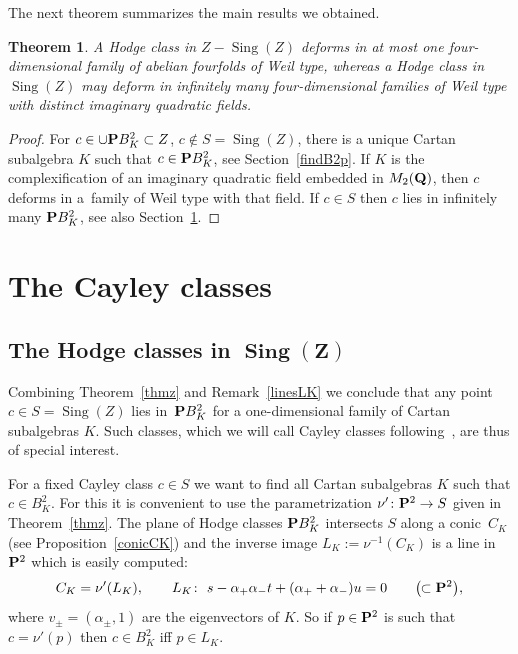 \documentclass[10pt,a4paper]{amsart}
\numberwithin{equation}{section}
\newtheorem{Theorem}{Theorem}[section]
\begin{document}
The next theorem summarizes the main results we obtained.

\begin{Theorem} \label{thmsum}
A Hodge class in $Z-\operatorname{Sing}(Z)$ deforms in at most one four-dimensional family
of abelian fourfolds of Weil type, whereas a Hodge class in~$\operatorname{Sing}(Z)$ may deform in infinitely many
four-dimensional families of Weil type with distinct imaginary quadratic fields.
\end{Theorem}

\begin{proof}
For $c\in \cup {\bf P} B^2_K\subset Z$, $c\not\in S=\operatorname{Sing}(Z)$, there is a unique Cartan subalgebra $K$
such that $c\in{\bf P} B^2_K$, see Section~\ref{findB2p}. If $K$ is the complexification of an imaginary quadratic
field embedded in $M_2({\bf Q})$, then $c$ deforms in a~family of Weil type with that field.
If $c\in S$ then $c$ lies in infinitely many ${\bf P} B^2_K$, see also Section~\ref{cayleyclasses}.
\end{proof}

\section{The Cayley classes}\label{cayleyclasses}

\subsection[The Hodge classes in Sing(Z)]{The Hodge classes in $\boldsymbol{\operatorname{Sing}(Z)}$}

Combining Theorem~\ref{thmz} and Remark~\ref{linesLK} we conclude that any point
$c\in S=\operatorname{Sing}(Z)$ lies in~${\bf P} B^2_K$ for a one-dimensional family of
Cartan subalgebras $K$. Such classes, which we will call Cayley classes following~\cite{Markman},
are thus of special interest.

For a fixed Cayley class $c\in S$ we want to find all Cartan subalgebras $K$ such that $c\in B^2_K$.
For this it is convenient to use the parametrization $\nu'\colon {\bf P}^2\rightarrow S$ given in Theorem~\ref{thmz}. The plane of Hodge classes ${\bf P} B^2_K$ intersects $S$ along a conic~$C_K$
(see Proposition~\ref{conicCK})
and the inverse image $L_K:=\nu^{-1}(C_K)$ is a line in ${\bf P}^2$ which is easily computed:
\[
C_K = \nu'(L_K),\qquad L_K\colon \ s - \alpha_+\alpha_- t + (\alpha_+ + \alpha_-)u = 0
\qquad\big(\!\!\subset {\bf P}^2\big),
\]
where $v_\pm=(\alpha_\pm,1)$ are the eigenvectors of $K$. So if $p\in{\bf P}^2$ is such that
$c=\nu'(p)$ then $c\in B^2_K$ iff $p\in L_K$.
\end{document}
